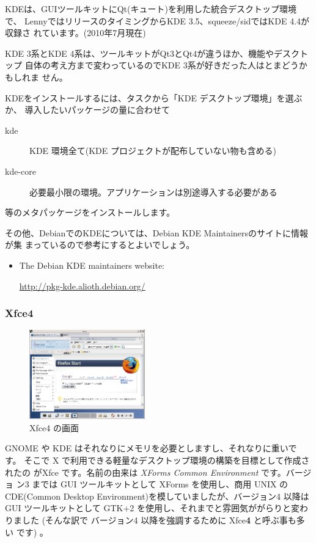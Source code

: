 \documentclass[mingoth,a4paper]{jsarticle}
\begin{document}
KDEは、GUIツールキットにQt(キュート)を利用した統合デスクトップ環境で、
LennyではリリースのタイミングからKDE 3.5、squeeze/sidではKDE 4.4が収録さ
れています。(2010年7月現在)

KDE 3系とKDE 4系は、ツールキットがQt3とQt4が違うほか、機能やデスクトップ
自体の考え方まで変わっているのでKDE 3系が好きだった人はとまどうかもしれま
せん。

KDEをインストールするには、タスクから「KDE デスクトップ環境」を選ぶか、
導入したいパッケージの量に合わせて
\begin{description}
      \item[kde]
    KDE 環境全て(KDE プロジェクトが配布していない物も含める)
      \item[kde-core]
    必要最小限の環境。アプリケーションは別途導入する必要がある
\end{description}
等のメタパッケージをインストールします。

その他、DebianでのKDEについては、Debian KDE Maintainersのサイトに情報が集
まっているので参考にするとよいでしょう。

\begin{itemize}
 \item The Debian KDE maintainers website:

       \url{http://pkg-kde.alioth.debian.org/}

\end{itemize}

\subsubsection{Xfce4}
\begin{figure}
 \begin{center}
  \includegraphics[width=5cm]{image201004/xfce4.png}
  \caption{Xfce4 の画面}
 \end{center}
\end{figure}

GNOME や KDE はそれなりにメモリを必要としますし、それなりに重いです。
そこで X で利用できる軽量なデスクトップ環境の構築を目標として作成されたの
がXfce です。名前の由来は {\it XForms Common Environment} です。バージョ
ン3 までは GUI ツールキットとして XForms を使用し、商用 UNIX の
CDE(Common Desktop Environment)を模していましたが、バージョン4 以降はGUI
ツールキットとして GTK+2 を使用し、それまでと雰囲気ががらりと変わりました
(そんな訳で バージョン4 以降を強調するために Xfce{\bf{4}} と呼ぶ事も多い
です) 。
\end{document}
